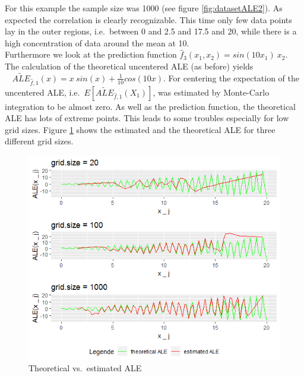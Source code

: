 \documentclass[
]{krantz}
\begin{document}
For this example the sample size was 1000 (see figure \ref{fig:datasetALE2}). As expected the correlation is clearly recognizable. This time only few data points lay in the outer regions, i.e.~between 0 and 2.5 and 17.5 and 20, while there is a high concentration of data around the mean at 10.\\
Furthermore we look at the prediction function \(\hat{f}_3(x_1,x_2) = sin(10x_1)~x_2\). The calculation of the theoretical uncentered ALE (as before) yields \(~~~~\widetilde{ALE}_{\hat{f},1}(x) = x~sin(x) + \frac{1}{10}cos(10x)\). For centering the expectation of the uncentered ALE, i.e.~\(E[\widetilde{ALE}_{\hat{f},1}(X_1)]\), was estimated by Monte-Carlo integration to be almost zero.
As well as the prediction function, the theoretical ALE has lots of extreme points. This leads to some troubles especially for low grid sizes.
Figure \ref{fig:example33gs} shows the estimated and the theoretical ALE for three different grid sizes.

\begin{figure}
\includegraphics[width=1\linewidth]{images/ALE_2_example3_3gs_} \caption{Theoretical vs.~estimated ALE}\label{fig:example33gs}
\end{figure}
\end{document}
